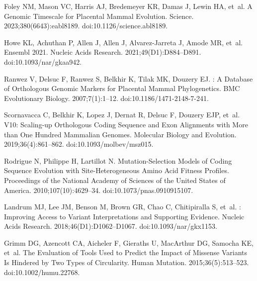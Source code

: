 \documentclass{article}
\begin{document}
\begin{thebibliography}{10}
        Foley NM, Mason VC, Harris AJ, Bredemeyer KR, Damas J, Lewin HA, et~al.
        \newblock A Genomic Timescale for Placental Mammal Evolution.
        \newblock Science. 2023;380(6643):eabl8189.
        \newblock doi:{10.1126/science.abl8189}.

        Howe KL, Achuthan P, Allen J, Allen J, {Alvarez-Jarreta} J, Amode MR, et~al.
        \newblock Ensembl 2021.
        \newblock Nucleic Acids Research. 2021;49(D1):D884--D891.
        \newblock doi:{10.1093/nar/gkaa942}.

        Ranwez V, Delsuc F, Ranwez S, Belkhir K, Tilak MK, Douzery EJ.
        : {{A}} Database of Orthologous Genomic Markers for
        Placental Mammal Phylogenetics.
        \newblock BMC Evolutionary Biology. 2007;7(1):1--12.
        \newblock doi:{10.1186/1471-2148-7-241}.

        Scornavacca C, Belkhir K, Lopez J, Dernat R, Delsuc F, Douzery EJP, et~al.
         V10: {{Scaling-up}} Orthologous Coding Sequence and Exon
        Alignments with More than One Hundred Mammalian Genomes.
        \newblock Molecular Biology and Evolution. 2019;36(4):861--862.
        \newblock doi:{10.1093/molbev/msz015}.

        Rodrigue N, Philippe H, Lartillot N.
        \newblock Mutation-Selection Models of Coding Sequence Evolution with
        Site-Heterogeneous Amino Acid Fitness Profiles.
        \newblock Proceedings of the National Academy of Sciences of the United States
        of America. 2010;107(10):4629--34.
        \newblock doi:{10.1073/pnas.0910915107}.

        Landrum MJ, Lee JM, Benson M, Brown GR, Chao C, Chitipiralla S, et~al.
        : Improving Access to Variant Interpretations and
        Supporting Evidence.
        \newblock Nucleic Acids Research. 2018;46(D1):D1062--D1067.
        \newblock doi:{10.1093/nar/gkx1153}.

        Grimm DG, Azencott CA, Aicheler F, Gieraths U, MacArthur DG, Samocha KE, et~al.
        \newblock The {{Evaluation}} of {{Tools Used}} to {{Predict}} the {{Impact}} of
            {{Missense Variants Is Hindered}} by {{Two Types}} of {{Circularity}}.
        \newblock Human Mutation. 2015;36(5):513--523.
        \newblock doi:{10.1002/humu.22768}.


\end{thebibliography}
\end{document}
